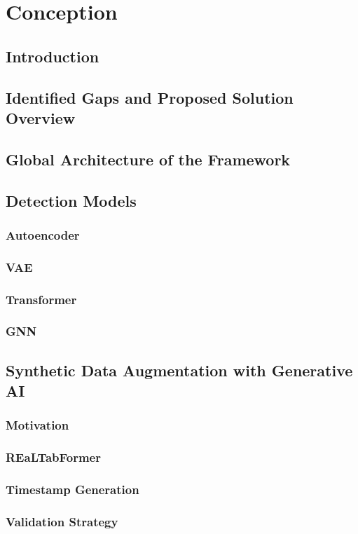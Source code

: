 \chapter{Conception}
\label{chap:conception}
\section{Introduction}
\section{Identified Gaps and Proposed Solution Overview}
\section{Global Architecture of the Framework}
\section{Detection Models}
\subsection{Autoencoder}
\subsection{VAE}
\subsection{Transformer}
\subsection{GNN}
\section{Synthetic Data Augmentation with Generative AI}
\subsection{Motivation}
\subsection{REaLTabFormer}
\subsection{Timestamp Generation}
\subsection{Validation Strategy}
